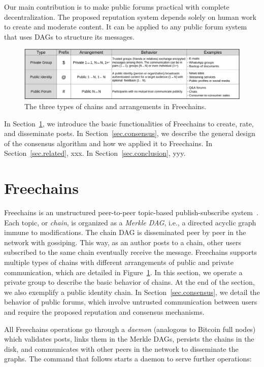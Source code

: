 \documentclass[10pt,journal,compsoc]{IEEEtran}
\newcommand{\FC}       {Freechains\xspace}
\begin{document}
Our main contribution is to make public forums practical with complete
decentralization.
The proposed reputation system depends solely on human work to create and
moderate content.
It can be applied to any public forum system that uses DAGs to structure its
messages.

\begin{figure}[ht]
\centering
\includegraphics[width=\textwidth]{arrangements.png}
\caption{The three types of chains and arrangements in \FC.}
\label{fig.table}
\end{figure}

In Section~\ref{sec.freechains}, we introduce the basic functionalities of \FC
to create, rate, and disseminate posts.
In Section~\ref{sec.consensus}, we describe the general design of the consensus
algorithm and how we applied it to \FC.
In Section~\ref{sec.related}, xxx.
In Section~\ref{sec.conclusion}, yyy.

\section{Freechains}
\label{sec.freechains}

\FC is an unstructured peer-to-peer topic-based publish-subscribe
system~\cite{fcs.sbseg20}.
Each topic, or \emph{chain}, is organized as a \emph{Merkle DAG}, i.e., a
directed acyclic graph immune to modifications.
The chain DAG is disseminated peer by peer in the network with gossiping.
This way, as an author posts to a chain, other users subscribed to the same
chain eventually receive the message.
\FC supports multiple types of chains with different arrangements of public and
private communication, which are detailed in Figure~\ref{fig.table}.
In this section, we operate a private group to describe the basic behavior of
chains.
At the end of the section, we also exemplify a public identity chain.
In Section~\ref{sec.consensus}, we detail the behavior of public forums, which
involve untrusted communication between users and require the proposed
reputation and consensus mechanisms.

All \FC operations go through a \emph{daemon} (analogous to Bitcoin full nodes)
which validates posts, links them in the Merkle DAGs, persists the chains in
the disk, and communicates with other peers in the network to disseminate the
graphs.
The command that follows starts a daemon to serve further operations:
\end{document}
